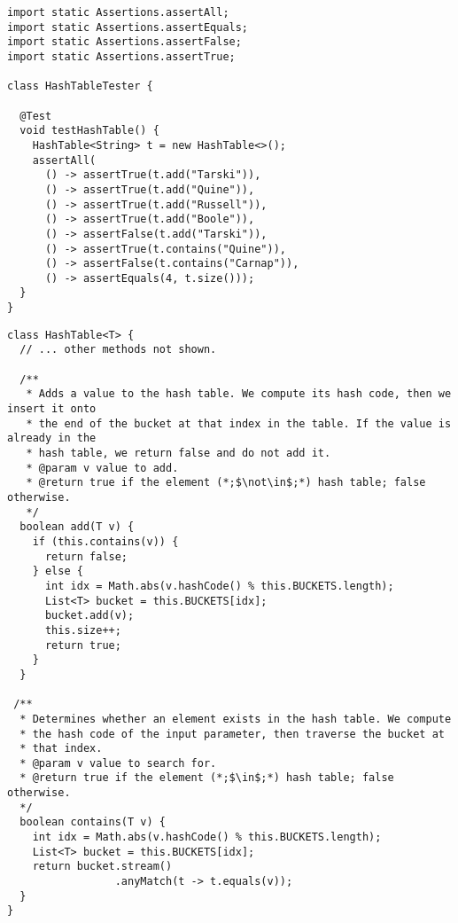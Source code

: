 \begin{lstlisting}[language=MyJava]
import static Assertions.assertAll;
import static Assertions.assertEquals;
import static Assertions.assertFalse;
import static Assertions.assertTrue;

class HashTableTester {

  @Test
  void testHashTable() {
    HashTable<String> t = new HashTable<>();
    assertAll(
      () -> assertTrue(t.add("Tarski")),
      () -> assertTrue(t.add("Quine")),
      () -> assertTrue(t.add("Russell")),
      () -> assertTrue(t.add("Boole")),
      () -> assertFalse(t.add("Tarski")),
      () -> assertTrue(t.contains("Quine")),
      () -> assertFalse(t.contains("Carnap")),
      () -> assertEquals(4, t.size()));
  }
}
\end{lstlisting}

\newpage
\begin{lstlisting}[language=MyJava]
class HashTable<T> {
  // ... other methods not shown.

  /**
   * Adds a value to the hash table. We compute its hash code, then we insert it onto
   * the end of the bucket at that index in the table. If the value is already in the
   * hash table, we return false and do not add it.
   * @param v value to add.
   * @return true if the element (*;$\not\in$;*) hash table; false otherwise.
   */
  boolean add(T v) {
    if (this.contains(v)) { 
      return false; 
    } else {
      int idx = Math.abs(v.hashCode() % this.BUCKETS.length);
      List<T> bucket = this.BUCKETS[idx];
      bucket.add(v);
      this.size++;
      return true;
    }
  }

 /**
  * Determines whether an element exists in the hash table. We compute 
  * the hash code of the input parameter, then traverse the bucket at 
  * that index.
  * @param v value to search for.
  * @return true if the element (*;$\in$;*) hash table; false otherwise.
  */
  boolean contains(T v) {
    int idx = Math.abs(v.hashCode() % this.BUCKETS.length);
    List<T> bucket = this.BUCKETS[idx];
    return bucket.stream()
                 .anyMatch(t -> t.equals(v));
  }
}
\end{lstlisting}
